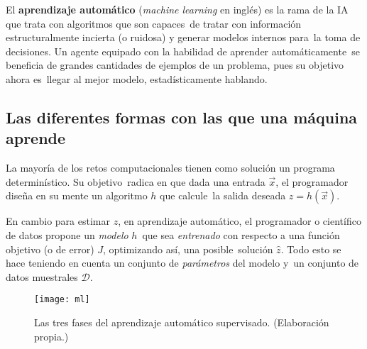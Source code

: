 El \textbf{aprendizaje automático} (\emph{machine learning} en inglés) es la rama de la IA que trata con algoritmos que son capaces\
de tratar con información estructuralmente incierta (o ruidosa) y generar modelos internos para\
la toma de decisiones. Un agente equipado con la habilidad de aprender automáticamente\
se beneficia de grandes cantidades de ejemplos de un problema, pues su objetivo ahora es\
llegar al mejor modelo, estadísticamente hablando.

\subsection{Las diferentes formas con las que una máquina aprende}

\noindent
La mayoría de los retos computacionales tienen como solución un programa determinístico. Su objetivo\
radica en que dada una entrada $\vec{x}$, el programador diseña en su mente un algoritmo $h$ que calcule\
la salida deseada $z = h(\vec{x})$.\par
En cambio para estimar $z$, en aprendizaje automático, el programador o científico de datos propone un \emph{modelo} $h$\
que sea \emph{entrenado} con respecto a una función objetivo (o de error) $J$, optimizando así, una posible\
solución $\hat{z}$. Todo esto se hace teniendo en cuenta un conjunto de \emph{parámetros} del modelo y\
un conjunto de datos muestrales $\mathcal{D}$.

\begin{figure}[h]
  \centering
  \texttt{[image: ml]}
  \caption{Las tres fases del aprendizaje automático supervisado.
    (Elaboración propia.)}
\end{figure}

